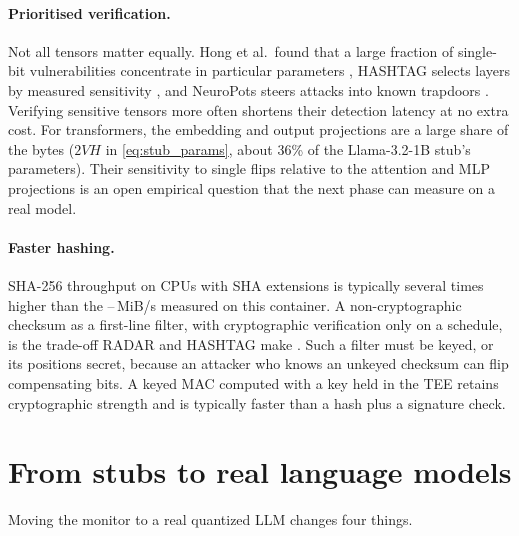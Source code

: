\paragraph{Prioritised verification.} Not all tensors matter equally. Hong et al.\ found that a
large fraction of single-bit vulnerabilities concentrate in particular parameters
\cite{hong2019terminal}, HASHTAG selects layers by measured sensitivity
\cite{javaheripi2021hashtag}, and NeuroPots steers attacks into known trapdoors
\cite{liu2023neuropots}. Verifying sensitive tensors more often shortens their detection latency
at no extra cost. For transformers, the embedding and output projections are a large share of
the bytes ($2VH$ in \cref{eq:stub_params}, about 36\% of the Llama-3.2-1B stub's parameters). Their
sensitivity to single flips relative to the attention and MLP projections is an open empirical
question that the next phase can measure on a real model.

\paragraph{Faster hashing.} SHA-256 throughput on CPUs with SHA extensions is typically several
times higher than the \MerkThrMin{}--\MerkThrMax{}\,MiB/s measured on this container. A non-cryptographic
checksum as a first-line filter, with cryptographic verification only on a schedule, is the
trade-off RADAR and HASHTAG make \cite{li2021radar,javaheripi2021hashtag}. Such a filter must be
keyed, or its positions secret, because an attacker who knows an unkeyed checksum can flip
compensating bits. A keyed MAC computed with a key held in the TEE retains cryptographic strength
and is typically faster than a hash plus a signature check.

\section{From stubs to real language models}
\label{sec:disc:llm}

Moving the monitor to a real quantized LLM changes four things.

